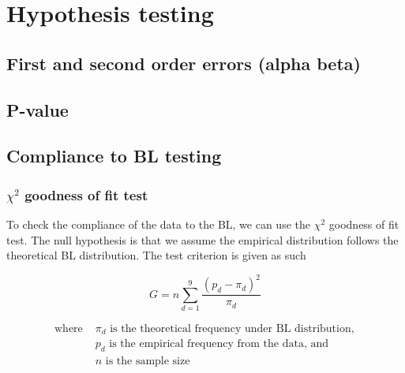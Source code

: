 




\section{Hypothesis testing}

\subsection{First and second order errors (alpha beta)}

\subsection{P-value}

\subsection{Compliance to BL testing}

\subsubsection*{$\chi^2$ goodness of fit test}

To check the compliance of the data to the BL, we can use the $\chi^2$ goodness of fit test. The null hypothesis is that we assume the empirical distribution follows the theoretical BL distribution. The test criterion is given as such 

\begin{equation}
    \label{chi-sq-test}
    G= n \sum\limits_{d=1}^{9} \frac{(p_d -\pi_d)^2}{\pi_d} 
\end{equation}

\begin{align*}
    \text{where } &\pi_d \text{ is the theoretical frequency under BL distribution}, \\
    &p_d \text{ is the empirical frequency from the data, and} \\ 
    &n \text{ is the sample size}
\end{align*} 

